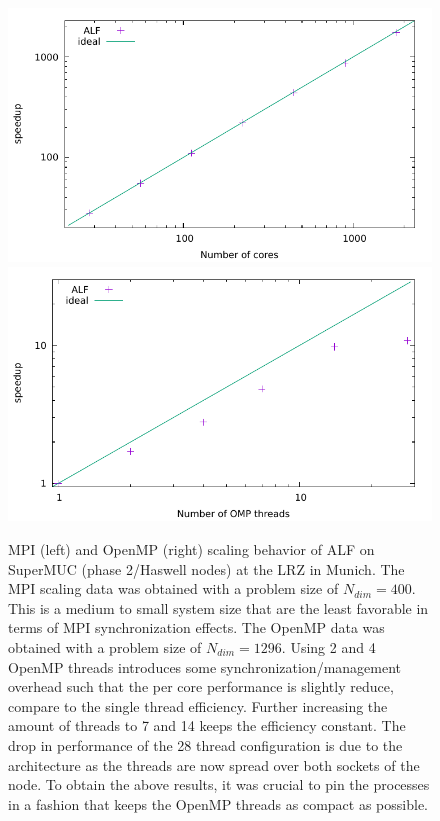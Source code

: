 \begin{figure}[H]
	\begin{center}
		\includegraphics[scale=0.6]{Figures/MPI_scaling_ALF.pdf}
		\includegraphics[scale=0.6]{Figures/OMP_scaling_ALF.pdf}
	\end{center}
	\caption{\label{fig_scaling}MPI (left) and OpenMP (right) scaling behavior of ALF on SuperMUC (phase 2/Haswell nodes) at the LRZ in Munich.
		The MPI scaling data was obtained with a problem size of $N_{dim}=400$. This is a medium to small system size that are the least favorable in terms of MPI synchronization effects.
		The OpenMP data was obtained with a problem size of $N_{dim}=1296$. Using 2 and 4 OpenMP threads introduces some synchronization/management overhead such that the per core performance is slightly reduce, compare to the single thread efficiency. Further increasing the amount of threads to 7 and 14 keeps the efficiency constant. The drop in performance of the 28 thread configuration is due to the architecture as the threads are now spread over both sockets of the node. To obtain the above results, it was crucial to pin the processes in a fashion that keeps the OpenMP threads as compact as possible.}
\end{figure}

